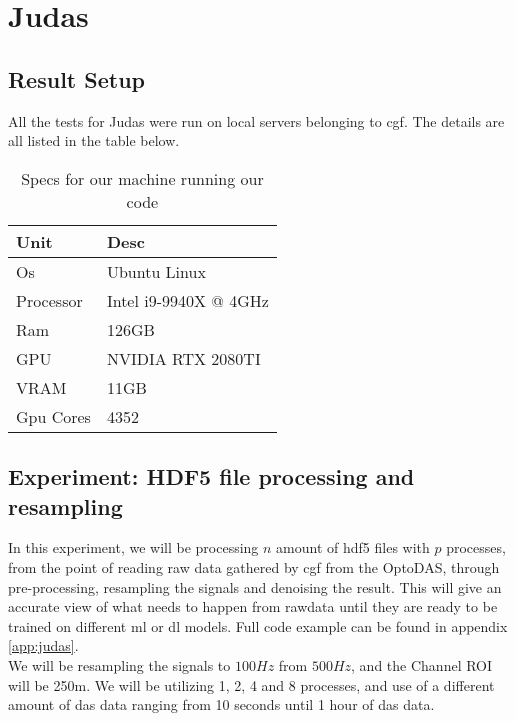 \section{Judas}
\label{res:Judas}

\subsection{Result Setup}

All the tests for Judas were run on local servers belonging to \acrshort{cgf}. The details are all listed in the table below. \\


\begin{table}[h]
\centering
\begin{tabular}{|l|l|}
\hline
\textbf{Unit} & \textbf{Desc}         \\ \hline
Os            & Ubuntu Linux          \\ \hline
Processor     & Intel i9-9940X @ 4GHz \\ \hline
Ram           & 126GB                 \\ \hline
GPU           & NVIDIA RTX 2080TI     \\ \hline
VRAM          & 11GB                  \\ \hline
Gpu Cores     & 4352                  \\ \hline
\end{tabular}
\label{tab:cgfspecs}
\caption{Specs for our machine running our code}
\end{table}

\subsection{Experiment: HDF5 file processing and resampling}

In this experiment, we will be processing $n$ amount of \acrshort{hdf5} files with $p$ processes, from the point of reading raw data gathered by \acrshort{cgf} from the OptoDAS, through pre-processing, resampling the signals and denoising the result. This will give an accurate view of what needs to happen from rawdata until they are ready to be trained on different \acrshort{ml} or \acrshort{dl} models. Full code example can be found in appendix \ref{app:judas}. \\

We will be resampling the signals to $100Hz$ from $500Hz$, and the Channel ROI will be 250m. We will be utilizing 1, 2, 4 and 8 processes, and use of a different amount of \acrshort{das} data ranging from 10 seconds until 1 hour of \acrshort{das} data.



